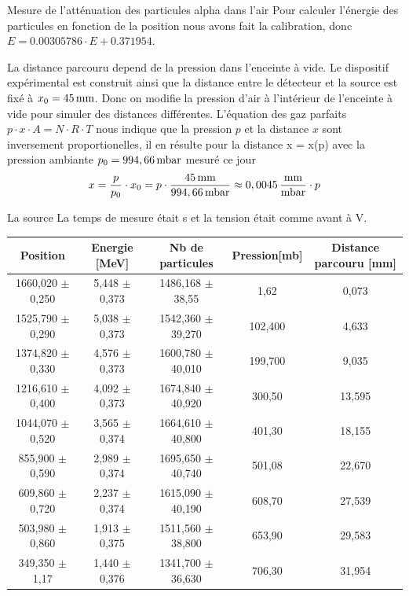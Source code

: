 \documentclass[a4paper,11pt]{scrartcl}
\begin{document}
 \begin{section}{Mesure de l'atténuation des particules alpha dans l'air}
  Pour calculer l'énergie des particules en fonction de la position nous avons fait la calibration, donc $E=0.00305786  \cdot E +0.371954$.

  La distance parcouru depend de la pression dans l'enceinte à vide. Le dispositif expérimental est construit ainsi que la distance entre le détecteur et la source est fixé à $x_0=\unit[45]{mm}$. Donc on modifie la pression d'air à l'intérieur de l'enceinte à vide pour simuler des distances différentes. L'équation des gaz parfaits $p \cdot x \cdot A =N \cdot R \cdot T$ nous indique que la pression $p$ et la distance $x$ sont inversement proportionelles, il en résulte pour la distance x = x(p) avec la pression ambiante $p_0=\unit[994,66]{mbar}$ mesuré ce jour
   \begin{equation*}
    x=\frac{p}{p_0}\cdot x_0=p\cdot\frac{\unit[45]{mm}}{\unit[994,66]{mbar}}\approx\unit[0,0045]{\frac{mm}{mbar}}\cdot p
   \end{equation*}
  \begin{subsection}{La source }
   La temps de mesure était \unit[20]{s} et la tension était comme avant à \unit[80]{V}.
    \begin{center}
     \begin{tabular}{c|c|c|c|c}
      Position	&Energie [MeV]	&Nb de particules	&Pression[mb]	&Distance parcouru [mm]\\ \hline
      1660,020 $\pm$ 0,250	&5,448 $\pm$ 0,373	&1486,168 $\pm$ 38,55	&1,62	&0,073\\		
      1525,790 $\pm$ 0,290	&5,038 $\pm$ 0,373	&1542,360 $\pm$ 39,270	&102,400	&4,633\\
      1374,820 $\pm$ 0,330	&4,576 $\pm$ 0,373	&1600,780 $\pm$ 40,010	&199,700	&9,035\\
      1216,610 $\pm$ 0,400	&4,092 $\pm$ 0,373	&1674,840 $\pm$ 40,920	&300,50	&13,595\\
      1044,070 $\pm$ 0,520	&3,565 $\pm$ 0,374	&1664,610 $\pm$ 40,800	&401,30	&18,155\\
      855,900 $\pm$ 0,590	&2,989 $\pm$ 0,374	&1695,650 $\pm$ 40,740	&501,08	&22,670\\
      609,860 $\pm$ 0,720	&2,237 $\pm$ 0,374	&1615,090 $\pm$ 40,190	&608,70	&27,539\\
      503,980 $\pm$ 0,860	&1,913 $\pm$ 0,375	&1511,560 $\pm$ 38,800	&653,90	&29,583\\
      349,350 $\pm$ 1,17	&1,440 $\pm$ 0,376	&1341,700 $\pm$ 36,630	&706,30	&31,954\\

\end{tabular}
\end{center}
\end{subsection}
\end{section}
\end{document}

